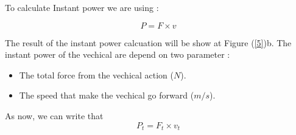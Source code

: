 \documentclass[12pt,a4paper]{article}
\numberwithin{equation}{section}
\begin{document}
	To calculate Instant power we are using :
	
	\begin{equation}
		P = F \times v \label{eq10}
	\end{equation}	
	
	The result of the instant power calcuation will be show at Figure (\ref{5})b. The instant power of the vechical are depend on two parameter :
	\begin{itemize}
		\item The total force from the vechical action ($N$).
		\item The speed that make the vechical go forward ($m/s$).
	\end{itemize}	                                                                                                                                                                  
	\indent As now, we can write that 
		\begin{equation}
			P_t = F_t \times v_t 
		\end{equation} 
	\newpage
	
\end{document}
